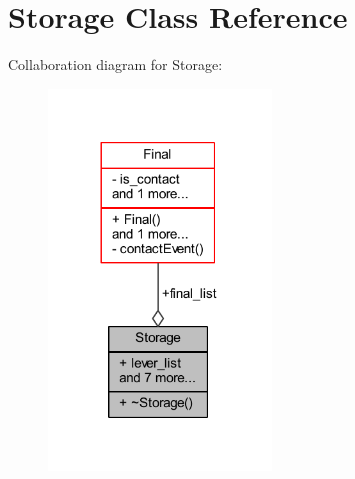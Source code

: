 \hypertarget{class_storage}{}\section{Storage Class Reference}
\label{class_storage}


Collaboration diagram for Storage\+:\nopagebreak
\begin{figure}[H]
\begin{center}
\leavevmode
\includegraphics[width=168pt]{class_storage__coll__graph}
\end{center}
\end{figure}
